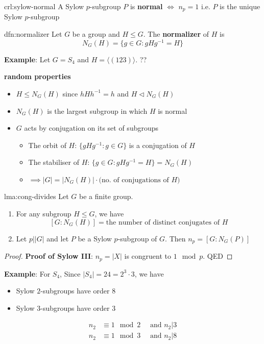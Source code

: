 \documentclass{article}
\begin{document}
\begin{crl}[]{crl:sylow-normal}{}
    A Sylow $p$-subgroup $P$ is \textbf{normal} $\iff$ $n_{p} = 1$ i.e. $P$ is the unique Sylow $p$-subgroup
\end{crl}

\begin{dfn}[Normalizer]{dfn:normalizer}{}
    Let $G$ be a group and $H \le G$. The \textbf{normalizer} of $H$ is
    \[N_{G}(H) = \{g \in G : gHg^{-1} = H\}\]
\end{dfn}

\textbf{Example}: Let $G = S_{4}$ and $H = \langle (123) \rangle$. ??

\textbf{random properties}
\begin{itemize}
    \item $H \le N_{G}(H)$ since $hHh^{-1} = h$ and $H \lhd N_{G}(H)$
    \item $N_{G}(H)$ is the largest subgroup in which $H$ is normal
    \item $G$ acts by conjugation on its set of subgroups
        \begin{itemize}
            \item The orbit of $H$: $\{gHg^{-1} : g\in G\}$ is a conjugation of $H$
            \item The stabiliser of $H$: $\{g\in G : gHg^{-1} = H\} = N_{G}(H)$ 
            \item $ \implies \lvert G \rvert = \lvert N_{G}(H) \rvert \cdot \text{(no. of conjugations of $H$)}$
        \end{itemize}
\end{itemize}

\begin{lma}[]{lma:cong-divides}{}
    Let $G$ be a finite group.
    \begin{enumerate}
        \item For any subgroup $H \le G$, we have
            \[[G : N_{G}(H)] = \text{the number of distinct conjugates of $H$}\]
        \item Let $p\lvert \lvert G \rvert$ and let $P$ be a Sylow $p$-subgroup of $G$. Then $n_{p} = [G : N_{G}(P)]$
    \end{enumerate}
\end{lma}

\begin{proof}
    \textbf{Proof of Sylow III}: $n_{p} = \lvert X \rvert$ is congruent to $1 \mod p$. QED
\end{proof}

\textbf{Example}: For $S_{4}$, Since $\lvert S_{4} \rvert = 24 = 2^{3} \cdot 3$, we have
\begin{itemize}
    \item Sylow $2$-subgroups have order $8$
    \item Sylow $3$-subgroups have order 3
\end{itemize}
\begin{align*}
    n_{2} & \equiv 1 \mod 2 \quad \text{ and } n_{2} | 3\\
    n_{2} & \equiv 1 \mod 3 \quad \text{ and } n_{2} | 8\\
\end{align*}
\end{document}
